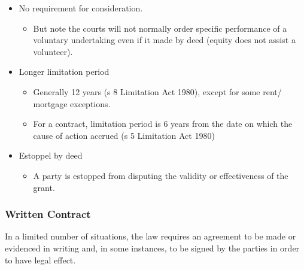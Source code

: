 \documentclass[
]{article}
\providecommand{\tightlist}{%
  \setlength{\itemsep}{0pt}\setlength{\parskip}{0pt}}
\begin{document}
\begin{itemize}
\tightlist
\item
  No requirement for consideration.

  \begin{itemize}
  \tightlist
  \item
    But note the courts will not normally order specific performance of
    a voluntary undertaking even if it made by deed (equity does not
    assist a volunteer).
  \end{itemize}
\item
  Longer limitation period

  \begin{itemize}
  \tightlist
  \item
    Generally 12 years (s 8 Limitation Act 1980), except for some rent/
    mortgage exceptions.
  \item
    For a contract, limitation period is 6 years from the date on which
    the cause of action accrued (s 5 Limitation Act 1980)
  \end{itemize}
\item
  Estoppel by deed

  \begin{itemize}
  \tightlist
  \item
    A party is estopped from disputing the validity or effectiveness of
    the grant.
  \end{itemize}
\end{itemize}

\hypertarget{written-contract}{%
\subsubsection{Written Contract}\label{written-contract}}

In a limited number of situations, the law requires an agreement to be
made or evidenced in writing and, in some instances, to be signed by the
parties in order to have legal effect.
\end{document}
